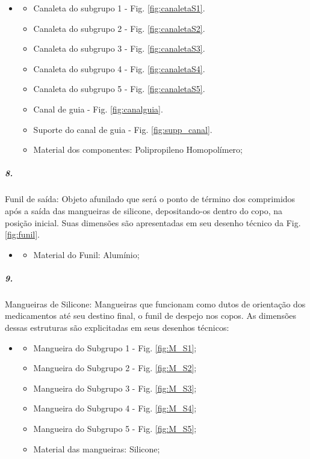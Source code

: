 \begin{itemize}
   \item[]
   \begin{itemize}
       \item Canaleta do subgrupo 1 - Fig. \ref{fig:canaletaS1}.
       \item Canaleta do subgrupo 2 - Fig. \ref{fig:canaletaS2}.
       \item Canaleta do subgrupo 3 - Fig. \ref{fig:canaletaS3}.
       \item Canaleta do subgrupo 4 - Fig. \ref{fig:canaletaS4}.
       \item Canaleta do subgrupo 5 - Fig. \ref{fig:canaletaS5}.
       \item Canal de guia - Fig. \ref{fig:canalguia}.
       \item Suporte do canal de guia - Fig. \ref{fig:supp_canal}.
       \item Material dos componentes: Polipropileno Homopolímero;
   \end{itemize}
   \end{itemize}

 
 \subparagraph*{8.}\label{retorno_funil}
 Funil de saída: Objeto afunilado que será o ponto de término dos comprimidos após a saída das mangueiras de silicone, depositando-os dentro do copo, na posição inicial. Suas dimensões são apresentadas em seu desenho técnico da Fig. \ref{fig:funil}.
 
 \begin{itemize}
   \item[]
   \begin{itemize}
       \item  Material do Funil: Alumínio;
   \end{itemize}
   \end{itemize}
  
  
 \subparagraph*{9.}\label{retorno_mangueira}
 Mangueiras de Silicone: Mangueiras que funcionam como dutos de orientação dos medicamentos até seu destino final, o funil de despejo nos copos. As dimensões dessas estruturas são explicitadas em seus desenhos técnicos:
 
 
 \begin{itemize}
    \item[]
    \begin{itemize}
    \item  Mangueira do Subgrupo 1 - Fig. \ref{fig:M_S1};
    \item  Mangueira do Subgrupo 2 - Fig. \ref{fig:M_S2};
    \item  Mangueira do Subgrupo 3 - Fig. \ref{fig:M_S3};
    \item  Mangueira do Subgrupo 4 - Fig. \ref{fig:M_S4};
    \item  Mangueira do Subgrupo 5 - Fig. \ref{fig:M_S5};
    \item Material das mangueiras: Silicone;
     \end{itemize}
 \end{itemize}
 


